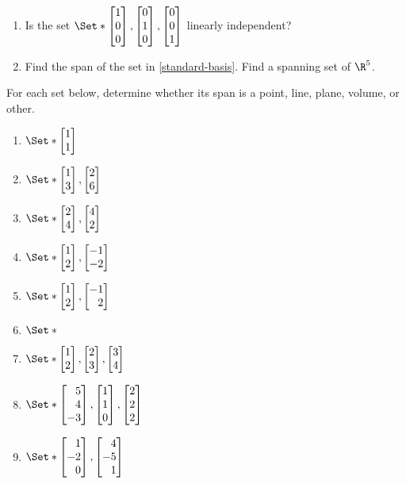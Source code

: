 \begin{exercises}
	\begin{problist}
		\prob
		\begin{enumerate}
		\item Is the set $\Set*{\mat{1\\0\\0},\mat{0\\1\\0},\mat{0\\0\\1}}$ linearly
		independent?
		\label{standard-basis}
		\item Find the span of the set in \ref{standard-basis}.
		\find Find a spanning set of $\R^5$.
	\end{enumerate}
		\prob
		For each set below, determine whether its span is a point, line, plane, volume, or other.
		\label{span of set}
		\begin{enumerate}
				\item   $\Set*{\mat{1\\1}}$
				\item   $\Set*{\mat{1\\3},\mat{2\\6}}$
				\item   $\Set*{\mat{2\\4},\mat{4\\2}}$
				\item   $\Set*{\mat{1\\2},\mat{-1\\-2}}$
				\item   $\Set*{\mat{1\\2},\mat{-1\\2}}$
				\item   $\Set*{}$
				\item		$\Set*{\mat{1\\2},\mat{2\\3},\mat{3\\4}}$
				\item   $\Set*{\mat{5\\4\\-3},\mat{1\\1\\0},\mat{2\\2\\2}}$
				\item   $\Set*{\mat{1\\-2\\0},\mat{4\\-5\\1}}$

\end{enumerate}
\end{problist}
\end{exercises}
